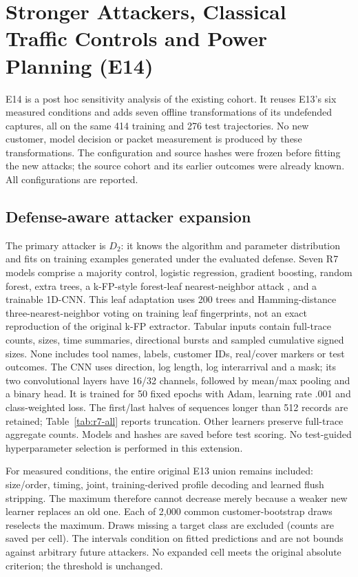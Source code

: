 \section{Stronger Attackers, Classical Traffic Controls and Power Planning (E14)}\label{sec:r7-supp}
E14 is a post hoc sensitivity analysis of the existing cohort. It reuses E13's six measured conditions and adds seven offline transformations of its undefended captures, all on the same 414 training and 276 test trajectories. No new customer, model decision or packet measurement is produced by these transformations. The configuration and source hashes were frozen before fitting the new attacks; the source cohort and its earlier outcomes were already known. All configurations are reported.

\subsection{Defense-aware attacker expansion}
The primary attacker is $D_2$: it knows the algorithm and parameter distribution and fits on training examples generated under the evaluated defense. Seven R7 models comprise a majority control, logistic regression, gradient boosting, random forest, extra trees, a k-FP-style forest-leaf nearest-neighbor attack \cite{hayes2016kfp}, and a trainable 1D-CNN. This leaf adaptation uses 200 trees and Hamming-distance three-nearest-neighbor voting on training leaf fingerprints, not an exact reproduction of the original k-FP extractor. Tabular inputs contain full-trace counts, sizes, time summaries, directional bursts and sampled cumulative signed sizes. None includes tool names, labels, customer IDs, real/cover markers or test outcomes. The CNN uses direction, log length, log interarrival and a mask; its two convolutional layers have 16/32 channels, followed by mean/max pooling and a binary head. It is trained for 50 fixed epochs with Adam, learning rate .001 and class-weighted loss. The first/last halves of sequences longer than 512 records are retained; Table~\ref{tab:r7-all} reports truncation. Other learners preserve full-trace aggregate counts. Models and hashes are saved before test scoring. No test-guided hyperparameter selection is performed in this extension.

For measured conditions, the entire original E13 union remains included: size/order, timing, joint, training-derived profile decoding and learned flush stripping. The maximum therefore cannot decrease merely because a weaker new learner replaces an old one. Each of 2,000 common customer-bootstrap draws reselects the maximum. Draws missing a target class are excluded (counts are saved per cell). The intervals condition on fitted predictions and are not bounds against arbitrary future attackers. No expanded cell meets the original absolute criterion; the threshold is unchanged.

